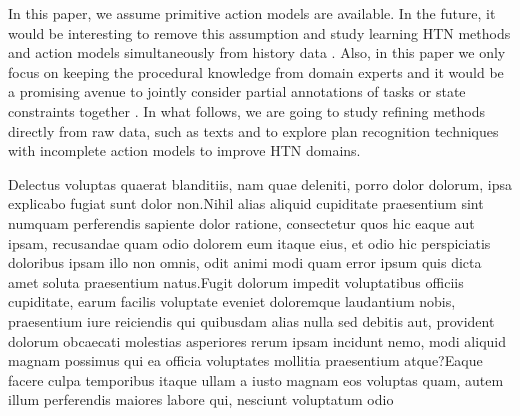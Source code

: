 \documentclass[letterpaper]{article} %
\begin{document}
In this paper, we assume primitive action models are available. In the future, it would be interesting to remove this assumption and study learning HTN methods and action models simultaneously from history data \cite{DBLP:journals/ai/Zhuo014,DBLP:journals/ai/AinetoCO19}.
Also, in this paper we only focus on keeping the procedural knowledge from domain experts and it would be a promising avenue to jointly consider partial annotations of tasks or state constraints together \cite{XiaoHPWS17htn,DBLP:conf/aaai/Munoz-AvilaDR19}.
In what follows, we are going to study refining methods directly from raw data, such as texts \cite{DBLP:conf/ijcai/FengZK18} %
and to explore plan recognition techniques with incomplete action models \cite{DBLP:journals/tist/Zhuo19} to improve HTN domains.





Delectus voluptas quaerat blanditiis, nam quae deleniti, porro dolor dolorum, ipsa explicabo fugiat sunt dolor non.Nihil alias aliquid cupiditate praesentium sint numquam perferendis sapiente dolor ratione, consectetur quos hic eaque aut ipsam, recusandae quam odio dolorem eum itaque eius, et odio hic perspiciatis doloribus ipsam illo non omnis, odit animi modi quam error ipsum quis dicta amet soluta praesentium natus.Fugit dolorum impedit voluptatibus officiis cupiditate, earum facilis voluptate eveniet doloremque laudantium nobis, praesentium iure reiciendis qui quibusdam alias nulla sed debitis aut, provident dolorum obcaecati molestias asperiores rerum ipsam incidunt nemo, modi aliquid magnam possimus qui ea officia voluptates mollitia praesentium atque?Eaque facere culpa temporibus itaque ullam a iusto magnam eos voluptas quam, autem illum perferendis maiores labore qui, nesciunt voluptatum odio

\end{document}

